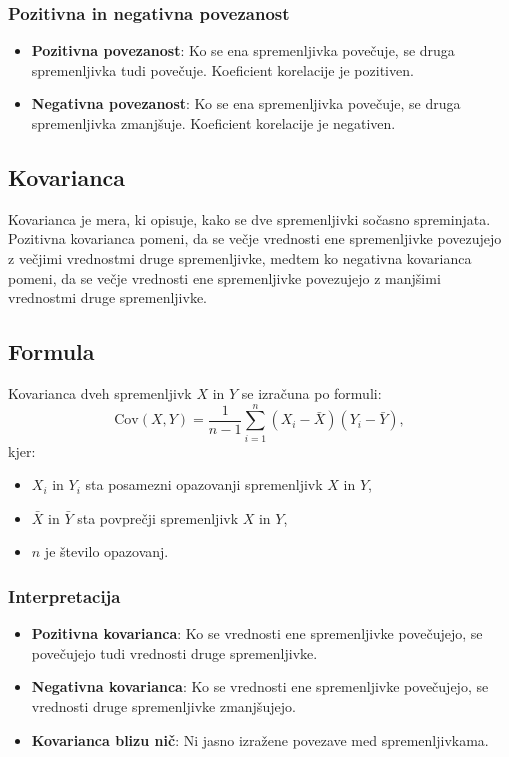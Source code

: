 \subsubsection*{Pozitivna in negativna povezanost}
\begin{itemize}
    \item \textbf{Pozitivna povezanost}: Ko se ena spremenljivka povečuje, se druga spremenljivka tudi povečuje. Koeficient korelacije je pozitiven.
    \item \textbf{Negativna povezanost}: Ko se ena spremenljivka povečuje, se druga spremenljivka zmanjšuje. Koeficient korelacije je negativen.
\end{itemize}

\subsection*{Kovarianca}

Kovarianca je mera, ki opisuje, kako se dve spremenljivki sočasno spreminjata. Pozitivna kovarianca pomeni, da se večje vrednosti ene spremenljivke povezujejo z večjimi vrednostmi druge spremenljivke, medtem ko negativna kovarianca pomeni, da se večje vrednosti ene spremenljivke povezujejo z manjšimi vrednostmi druge spremenljivke.

\subsection*{Formula}
Kovarianca dveh spremenljivk $X$ in $Y$ se izračuna po formuli:
\[\text{Cov}(X, Y) = \frac{1}{n-1} \sum_{i=1}^n (X_i - \bar{X})(Y_i - \bar{Y}),\]
kjer:
\begin{itemize}
    \item $X_i$ in $Y_i$ sta posamezni opazovanji spremenljivk $X$ in $Y$,
    \item $\bar{X}$ in $\bar{Y}$ sta povprečji spremenljivk $X$ in $Y$,
    \item $n$ je število opazovanj.
\end{itemize}

\subsubsection*{Interpretacija}
\begin{itemize}
    \item \textbf{Pozitivna kovarianca}: Ko se vrednosti ene spremenljivke povečujejo, se povečujejo tudi vrednosti druge spremenljivke.
    \item \textbf{Negativna kovarianca}: Ko se vrednosti ene spremenljivke povečujejo, se vrednosti druge spremenljivke zmanjšujejo.
    \item \textbf{Kovarianca blizu nič}: Ni jasno izražene povezave med spremenljivkama.
\end{itemize}

